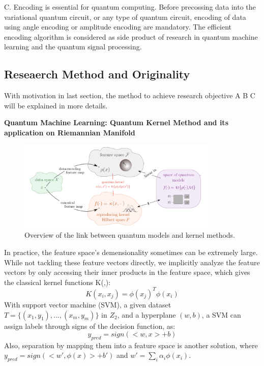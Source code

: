\documentclass{article}
\begin{document}
C. Encoding is essential for quantum computing. Before precossing data 
into the variational quantum circuit, or any type of quantum circuit, 
encoding of data using angle encoding or amplitude encoding are mandatory. 
The efficient encoding algorithm is considered as side product of research 
in quantum machine learning and the quantum signal processing. 

\subsection{Reseaerch Method and Originality}
With motivation in last section, the method to achieve 
research objective A B C will be explained in more details. 

\textbf{Quantum Machine Learning: Quantum Kernel Method and its
application on Riemannian Manifold}
\begin{figure}[h]
  \begin{center}
    \includegraphics[width=0.85\textwidth]{kernel1.png}    
  \end{center}
  \caption{Overview of the link between quantum models 
  and kernel methods.}
\end{figure}
In practice, the feature space's demensionality 
sometimes can be extremely large. While not 
tackling these feature vectors directly, we 
implicitly analyze the feature vectors by 
only accessing their inner products in the 
feature space, which gives the classical kernel functions K(,):
\begin{equation}
  K(x_i, x_j) = \phi(x_j)^T \phi(x_i)
\end{equation}
With support vector machine (SVM), a given dataset 
$T = \{ (x_1, y_1), ..., (x_m, y_m)\}$ in $Z_2$, and 
a hyperplane $(w,b)$, a SVM can assign labels through
signs of the decision function, as:
\begin{equation}
  y_{pred} = sign( <w,x> +b)
\end{equation}
Also, separation by mapping them into a feature space
is another solution, where $y_{pred} = sign( <w', \phi(x)> +b')$ and 
$w' = \sum_i \alpha_i \phi(x_i)$.
\end{document}

